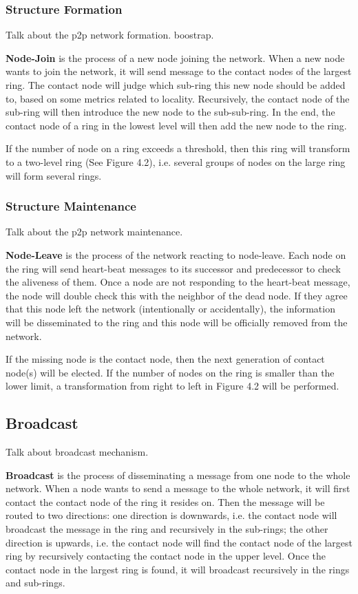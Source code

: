 \subsubsection{Structure Formation} \label{formation}

Talk about the p2p network formation. boostrap.

\textbf{Node-Join} is the process of a new node joining the network. When a new node wants to join the network, it will send message to the contact nodes of the largest ring. The contact node will judge which sub-ring this new node should be added to, based on some metrics related to locality. Recursively, the contact node of the sub-ring will then introduce the new node to the sub-sub-ring. In the end, the contact node of a ring in the lowest level will then add the new node to the ring.

If the number of node on a ring exceeds a threshold, then this ring will transform to a two-level ring (See Figure 4.2), i.e. several groups of nodes on the large ring will form several rings.

\subsubsection{Structure Maintenance} \label{maintain}

Talk about the p2p network maintenance.

\textbf{Node-Leave} is the process of the network reacting to node-leave. Each node on the ring will send heart-beat messages to its successor and predecessor to check the aliveness of them. Once a node are not responding to the heart-beat message, the node will double check this with the neighbor of the dead node. If they agree that this node left the network (intentionally or accidentally), the information will be disseminated to the ring and this node will be officially removed from the network.

If the missing node is the contact node, then the next generation of contact node(s) will be elected. If the number of nodes on the ring is smaller than the lower limit, a transformation from right to left in Figure 4.2 will be performed.

\subsection{Broadcast} \label{broadcast}

Talk about broadcast mechanism.

\textbf{Broadcast} is the process of disseminating a message from one node to the whole network. When a node wants to send a message to the whole network, it will first contact the contact node of the ring it resides on. Then the message will be routed to two directions: one direction is downwards, i.e. the contact node will broadcast the message in the ring and recursively in the sub-rings; the other direction is upwards, i.e. the contact node will find the contact node of the largest ring by recursively contacting the contact node in the upper level. Once the contact node in the largest ring is found, it will broadcast recursively in the rings and sub-rings.

